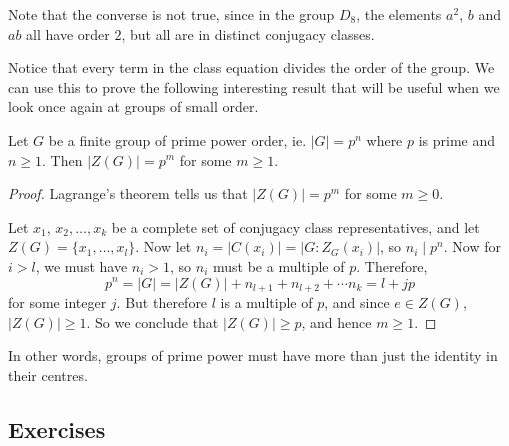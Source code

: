 Note that the converse is not true, since in the group $D_{8}$, the 
elements $a^{2}$, $b$ and $ab$ all have order $2$, but all are in 
distinct conjugacy classes.

Notice that every term in the class equation divides the order of 
the group.  We can use this to prove the following interesting result 
that will be useful when we look once again at groups of small order.

\begin{theorem}\label{thm:centreprimepower}
  Let $G$ be a finite group of prime power order, ie.  $|G| = p^{n}$
  where $p$ is prime and $n \ge 1$.  Then $|Z(G)| = p^{m}$ for some $m
  \ge 1$.
\end{theorem}
\begin{proof}
  Lagrange's theorem tells us that $|Z(G)| = p^{m}$ for some 
  $m \ge 0$.
  
  Let $x_{1}$, $x_{2}, \ldots, x_{k}$ be a complete set of conjugacy
  class representatives, and let $Z(G) = \{x_{1}, \ldots, x_{l}\}$. 
  Now let $n_{i} = |C(x_{i})| = |G : Z_{G}(x_{i})|$, so $n_{i} \mid
  p^{n}$.  Now for $i > l$, we must have $n_{i} > 1$, so $n_{i}$ must
  be a multiple of $p$.  Therefore,
  \[
    p^{n} = |G| = |Z(G)| + n_{l+1} + n_{l+2} + \cdots n_{k} = l + jp
  \]
  for some integer $j$.  But therefore $l$ is a multiple of $p$, and
  since $e \in Z(G)$, $|Z(G)| \ge 1$.  So we conclude that $|Z(G)| 
  \ge p$, and hence $m \ge 1$.
\end{proof}

In other words, groups of prime power must have more than just the 
identity in their centres.

\subsection*{Exercises}

